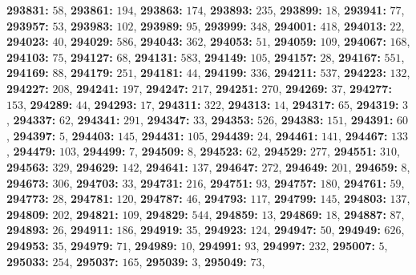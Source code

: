 \textsf{\bfseries 293831:} $58$, \textsf{\bfseries 293861:} $194$, \textsf{\bfseries 293863:} $174$, \textsf{\bfseries 293893:} $235$, \textsf{\bfseries 293899:} $18$, \textsf{\bfseries 293941:} $77$, \textsf{\bfseries 293957:} $53$, \textsf{\bfseries 293983:} $102$, \textsf{\bfseries 293989:} $95$, \textsf{\bfseries 293999:} $348$, \textsf{\bfseries 294001:} $418$, \textsf{\bfseries 294013:} $22$, \textsf{\bfseries 294023:} $40$, \textsf{\bfseries 294029:} $586$, \textsf{\bfseries 294043:} $362$, \textsf{\bfseries 294053:} $51$, \textsf{\bfseries 294059:} $109$, \textsf{\bfseries 294067:} $168$, \textsf{\bfseries 294103:} $75$, \textsf{\bfseries 294127:} $68$, \textsf{\bfseries 294131:} $583$, \textsf{\bfseries 294149:} $105$, \textsf{\bfseries 294157:} $28$, \textsf{\bfseries 294167:} $551$, \textsf{\bfseries 294169:} $88$, \textsf{\bfseries 294179:} $251$, \textsf{\bfseries 294181:} $44$, \textsf{\bfseries 294199:} $336$, \textsf{\bfseries 294211:} $537$, \textsf{\bfseries 294223:} $132$, \textsf{\bfseries 294227:} $208$, \textsf{\bfseries 294241:} $197$, \textsf{\bfseries 294247:} $217$, \textsf{\bfseries 294251:} $270$, \textsf{\bfseries 294269:} $37$, \textsf{\bfseries 294277:} $153$, \textsf{\bfseries 294289:} $44$, \textsf{\bfseries 294293:} $17$, \textsf{\bfseries 294311:} $322$, \textsf{\bfseries 294313:} $14$, \textsf{\bfseries 294317:} $65$, \textsf{\bfseries 294319:} $3$, \textsf{\bfseries 294337:} $62$, \textsf{\bfseries 294341:} $291$, \textsf{\bfseries 294347:} $33$, \textsf{\bfseries 294353:} $526$, \textsf{\bfseries 294383:} $151$, \textsf{\bfseries 294391:} $60$, \textsf{\bfseries 294397:} $5$, \textsf{\bfseries 294403:} $145$, \textsf{\bfseries 294431:} $105$, \textsf{\bfseries 294439:} $24$, \textsf{\bfseries 294461:} $141$, \textsf{\bfseries 294467:} $133$, \textsf{\bfseries 294479:} $103$, \textsf{\bfseries 294499:} $7$, \textsf{\bfseries 294509:} $8$, \textsf{\bfseries 294523:} $62$, \textsf{\bfseries 294529:} $277$, \textsf{\bfseries 294551:} $310$, \textsf{\bfseries 294563:} $329$, \textsf{\bfseries 294629:} $142$, \textsf{\bfseries 294641:} $137$, \textsf{\bfseries 294647:} $272$, \textsf{\bfseries 294649:} $201$, \textsf{\bfseries 294659:} $8$, \textsf{\bfseries 294673:} $306$, \textsf{\bfseries 294703:} $33$, \textsf{\bfseries 294731:} $216$, \textsf{\bfseries 294751:} $93$, \textsf{\bfseries 294757:} $180$, \textsf{\bfseries 294761:} $59$, \textsf{\bfseries 294773:} $28$, \textsf{\bfseries 294781:} $120$, \textsf{\bfseries 294787:} $46$, \textsf{\bfseries 294793:} $117$, \textsf{\bfseries 294799:} $145$, \textsf{\bfseries 294803:} $137$, \textsf{\bfseries 294809:} $202$, \textsf{\bfseries 294821:} $109$, \textsf{\bfseries 294829:} $544$, \textsf{\bfseries 294859:} $13$, \textsf{\bfseries 294869:} $18$, \textsf{\bfseries 294887:} $87$, \textsf{\bfseries 294893:} $26$, \textsf{\bfseries 294911:} $186$, \textsf{\bfseries 294919:} $35$, \textsf{\bfseries 294923:} $124$, \textsf{\bfseries 294947:} $50$, \textsf{\bfseries 294949:} $626$, \textsf{\bfseries 294953:} $35$, \textsf{\bfseries 294979:} $71$, \textsf{\bfseries 294989:} $10$, \textsf{\bfseries 294991:} $93$, \textsf{\bfseries 294997:} $232$, \textsf{\bfseries 295007:} $5$, \textsf{\bfseries 295033:} $254$, \textsf{\bfseries 295037:} $165$, \textsf{\bfseries 295039:} $3$, \textsf{\bfseries 295049:} $73$, 
